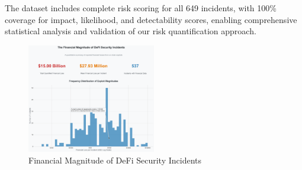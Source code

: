 The dataset includes complete risk scoring for all 649 incidents, with 100\% coverage for impact, likelihood, and detectability scores, enabling comprehensive statistical analysis and validation of our risk quantification approach.

\begin{figure}[H]
\centering
\includegraphics[width=0.5\textwidth]{../figure/methodology/fig4.png}
\caption{Financial Magnitude of DeFi Security Incidents}
\label{fig:data_pipeline}
\end{figure}
